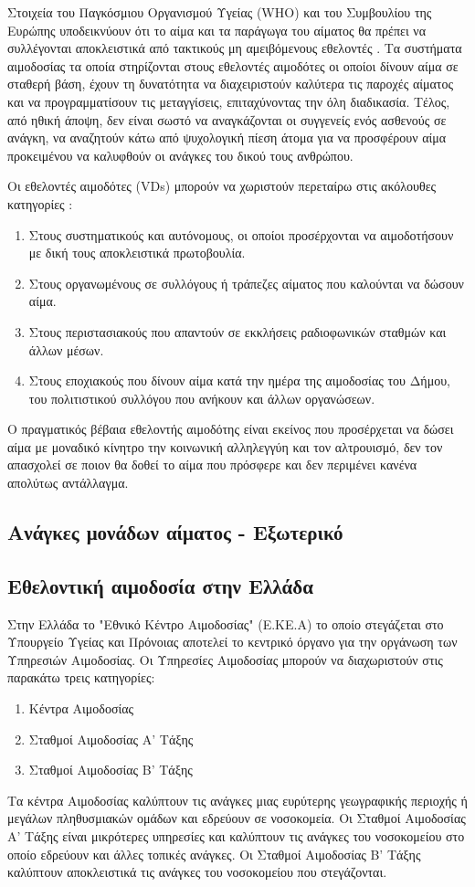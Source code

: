 		Στοιχεία του Παγκόσμιου Οργανισμού Υγείας (WHO) και του Συμβουλίου της Ευρώπης υποδεικνύουν ότι το αίμα και τα παράγωγα του αίματος θα πρέπει να συλλέγονται αποκλειστικά από τακτικούς μη αμειβόμενους εθελοντές \cite{VOX:VOX5295}. Τα συστήματα αιμοδοσίας τα οποία στηρίζονται στους εθελοντές αιμοδότες οι οποίοι δίνουν αίμα σε σταθερή βάση, έχουν τη δυνατότητα να διαχειριστούν καλύτερα τις παροχές αίματος και να προγραμματίσουν τις μεταγγίσεις, επιταχύνοντας την όλη διαδικασία. Τέλος, από ηθική άποψη, δεν είναι σωστό να αναγκάζονται οι συγγενείς ενός ασθενούς σε ανάγκη, να αναζητούν κάτω από ψυχολογική πίεση άτομα για να προσφέρουν αίμα προκειμένου να καλυφθούν οι ανάγκες του δικού τους ανθρώπου.

		Οι εθελοντές αιμοδότες (VDs) μπορούν να χωριστούν περεταίρω στις ακόλουθες κατηγορίες \cite{karabaggeli-blatsa}:
		\begin{enumerate}
			\item Στους συστηματικούς και αυτόνομους, οι οποίοι προσέρχονται να αιμοδοτήσουν με δική τους αποκλειστικά πρωτοβουλία.
			\item Στους οργανωμένους σε συλλόγους ή τράπεζες αίματος που καλούνται να δώσουν αίμα.
			\item Στους περιστασιακούς που απαντούν σε εκκλήσεις ραδιοφωνικών σταθμών και άλλων μέσων.
			\item Στους εποχιακούς που δίνουν αίμα κατά την ημέρα της αιμοδοσίας του Δήμου, του πολιτιστικού συλλόγου που ανήκουν και άλλων οργανώσεων.
		\end{enumerate}
		
		Ο πραγματικός βέβαια εθελοντής αιμοδότης είναι εκείνος που προσέρχεται να δώσει αίμα με μοναδικό κίνητρο την κοινωνική αλληλεγγύη και τον αλτρουισμό, δεν τον απασχολεί σε ποιον θα δοθεί το αίμα που πρόσφερε και δεν περιμένει κανένα απολύτως αντάλλαγμα.
	\subsection{Ανάγκες μονάδων αίματος - Εξωτερικό}		
	\subsection{Εθελοντική αιμοδοσία στην Ελλάδα}
		Στην Ελλάδα το "Εθνικό Κέντρο Αιμοδοσίας" (Ε.ΚΕ.Α) το οποίο στεγάζεται στο Υπουργείο Υγείας και Πρόνοιας αποτελεί το κεντρικό όργανο για την οργάνωση των Υπηρεσιών Αιμοδοσίας. Οι Υπηρεσίες Αιμοδοσίας μπορούν να διαχωριστούν στις παρακάτω τρεις κατηγορίες:
		\begin{enumerate}
			\item Κέντρα Αιμοδοσίας
			\item Σταθμοί Αιμοδοσίας Α' Τάξης
			\item Σταθμοί Αιμοδοσίας Β' Τάξης
		\end{enumerate}		 
		 Τα κέντρα Αιμοδοσίας καλύπτουν τις ανάγκες μιας ευρύτερης γεωγραφικής περιοχής ή μεγάλων πληθυσμιακών ομάδων και εδρεύουν σε νοσοκομεία. Οι Σταθμοί Αιμοδοσίας Α' Τάξης είναι μικρότερες υπηρεσίες και καλύπτουν τις ανάγκες του νοσοκομείου στο οποίο εδρεύουν και άλλες τοπικές ανάγκες. Οι Σταθμοί Αιμοδοσίας Β' Τάξης καλύπτουν αποκλειστικά τις ανάγκες του νοσοκομείου που στεγάζονται.
		
